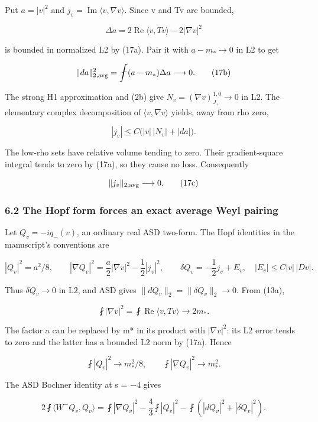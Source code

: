 \documentclass[11pt]{article}
\begin{document}
Put \(a=|v|^2\) and \(j_v=\operatorname{Im}\langle v,\nabla v\rangle\).
Since v and Tv are bounded,

\[
 \Delta a=2\operatorname{Re}\langle v,Tv\rangle-2|\nabla v|^2
\]

is bounded in normalized L2 by (17a). Pair it with \(a-m_*\to0\) in L2
to get

\[
 \|da\|_{2,\rm avg}^2
 =\fint(a-m_*)\Delta a\longrightarrow0.
\tag{17b}
\]

The strong H1 approximation and (2b) give
\(N_v=(\nabla v)^{1,0}_{J_+}\to0\) in L2. The elementary complex
decomposition of \(\langle v,\nabla v\rangle\) yields, away from rho
zero,

\[
 |j_v|\le C\bigl(|v|\,|N_v|+|da|\bigr).
\]

The low-rho sets have relative volume tending to zero. Their
gradient-square integral tends to zero by (17a), so they cause no loss.
Consequently

\[
 \|j_v\|_{2,\rm avg}\longrightarrow0.
\tag{17c}
\]

\hypertarget{o10strength:the-hopf-form-forces-an-exact-average-weyl-pairing}{%
\subsubsection{6.2 The Hopf form forces an exact average Weyl
pairing}\label{o10strength:the-hopf-form-forces-an-exact-average-weyl-pairing}}

Let \(Q_v=-iq_-(v)\), an ordinary real ASD two-form. The Hopf identities
in the manuscript's conventions are

\[
 |Q_v|^2=a^2/8,\qquad
 |\nabla Q_v|^2=\frac a2|\nabla v|^2-\frac12|j_v|^2,
 \qquad
 \delta Q_v=-\frac12j_v+E_v,
 \quad |E_v|\le C|v|\,|Dv|.
\tag{17d}
\]

Thus \(\delta Q_v\to0\) in L2, and ASD gives
\(\|dQ_v\|_2=\|\delta Q_v\|_2\to0\). From (13a),

\[
 \fint|\nabla v|^2=\fint\operatorname{Re}\langle v,Tv\rangle
 \longrightarrow2m_*.
\]

The factor a can be replaced by m* in its product with \(|\nabla v|^2\):
its L2 error tends to zero and the latter has a bounded L2 norm by
(17a). Hence

\[
 \fint|Q_v|^2\to m_*^2/8,\qquad
 \fint|\nabla Q_v|^2\to m_*^2.
\tag{17e}
\]

The ASD Bochner identity at s = −4 gives

\[
 2\fint\langle W^-Q_v,Q_v\rangle
 =\fint|\nabla Q_v|^2-\frac43\fint|Q_v|^2
 -\fint(|dQ_v|^2+|\delta Q_v|^2).
\]
\end{document}
